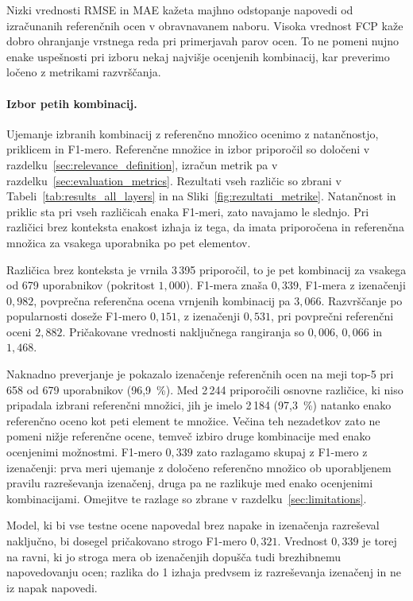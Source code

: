 \documentclass[a4paper,twoside,openright,12pt,slovene]{book}
\begin{document}
Nizki vrednosti RMSE in MAE kažeta majhno odstopanje
napovedi od izračunanih referenčnih ocen v obravnavanem
naboru. Visoka vrednost FCP kaže dobro ohranjanje
vrstnega reda pri primerjavah parov ocen.
To ne pomeni nujno enake uspešnosti pri izboru nekaj
najvišje ocenjenih kombinacij, kar preverimo ločeno
z metrikami razvrščanja.

\paragraph{Izbor petih kombinacij.}
Ujemanje izbranih kombinacij z referenčno množico
ocenimo z natančnostjo, priklicem in F1-mero. Referenčne množice in izbor priporočil
so določeni v razdelku~\ref{sec:relevance_definition},
izračun metrik pa v razdelku~\ref{sec:evaluation_metrics}.
Rezultati vseh različic so zbrani v
Tabeli~\ref{tab:results_all_layers} in na
Sliki~\ref{fig:rezultati_metrike}. Natančnost in priklic sta pri vseh
različicah enaka F1-meri, zato navajamo le slednjo. Pri različici brez
konteksta enakost izhaja iz tega, da imata priporočena in referenčna
množica za vsakega uporabnika po pet elementov.

Različica brez konteksta je vrnila 3\,395 priporočil,
to je pet kombinacij za vsakega od 679 uporabnikov (pokritost $1{,}000$).
F1-mera znaša $0{,}339$, F1-mera z izenačenji $0{,}982$, povprečna
referenčna ocena vrnjenih kombinacij pa $3{,}066$. Razvrščanje po
popularnosti doseže F1-mero $0{,}151$, z izenačenji $0{,}531$, pri
povprečni referenčni oceni $2{,}882$. Pričakovane vrednosti naključnega
rangiranja so $0{,}006$, $0{,}066$ in $1{,}468$.

Naknadno preverjanje je pokazalo izenačenje referenčnih
ocen na meji top-5 pri 658 od 679 uporabnikov
(96,9~\%). Med 2\,244 priporočili osnovne različice,
ki niso pripadala izbrani referenčni množici, jih je
imelo 2\,184 (97,3~\%) natanko enako referenčno oceno
kot peti element te množice. Večina teh nezadetkov
zato ne pomeni nižje referenčne ocene, temveč izbiro
druge kombinacije med enako ocenjenimi možnostmi.
F1-mero $0{,}339$ zato razlagamo skupaj z F1-mero z izenačenji:
prva meri ujemanje z določeno referenčno množico ob uporabljenem
pravilu razreševanja izenačenj, druga pa ne razlikuje med enako
ocenjenimi kombinacijami. Omejitve te razlage so zbrane v
razdelku~\ref{sec:limitations}.

Model, ki bi vse testne ocene napovedal brez napake in izenačenja
razreševal naključno, bi dosegel pričakovano strogo F1-mero $0{,}321$.
Vrednost $0{,}339$ je torej na ravni, ki jo stroga mera ob izenačenjih
dopušča tudi brezhibnemu napovedovanju ocen; razlika do 1 izhaja predvsem
iz razreševanja izenačenj in ne iz napak napovedi.
\end{document}
